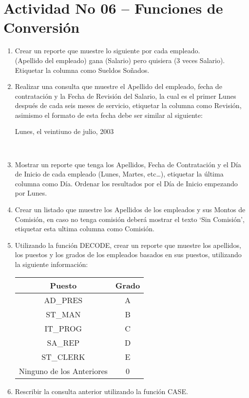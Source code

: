\section{Actividad No 06 – Funciones de Conversi\'on} 
		
\begin{enumerate}[1.]
	\item Crear un reporte que muestre lo siguiente por cada empleado.
	\\(Apellido del empleado) gana (Salario) pero quisiera (3 veces Salario).
	\\Etiquetar la columna como Sueldos Soñados.
	\\
	
	\item Realizar una consulta que muestre el Apellido del empleado, fecha de contratación y la Fecha de Revisión del Salario, la cual es el primer Lunes después de cada seis meses de servicio, etiquetar la columna como Revisión, asimismo el formato de esta fecha debe ser similar al siguiente: 
	\begin{center}
	Lunes, el veintiuno de julio, 2003 
	\end{center}
\	
	\item Mostrar un reporte que tenga los Apellidos, Fecha de Contrataci\'on y el D\'ia de Inicio de cada empleado (Lunes, Martes, etc…), etiquetar la \'ultima columna como D\'ia. Ordenar los resultados por el D\'ia de Inicio empezando por Lunes.
	\\	

	\item Crear un listado que muestre los Apellidos de los empleados y sus Montos de Comisión, en caso no tenga comisi\'on deber\'a mostrar el texto ‘Sin Comisi\'on’, etiquetar esta ultima columna como Comisi\'on.	
	\\
	
	\item Utilizando la función DECODE, crear un reporte que muestre los apellidos, los puestos y los grados de los empleados basados en sus puestos, utilizando la siguiente información:
	\begin{center}
		\begin{tabular}{ c c }
		Puesto & Grado \\
		\hline
		AD\_PRES & A \\
		ST\_MAN & B \\
		IT\_PROG & C \\
		SA\_REP & D \\
		ST\_CLERK & E \\
		Ninguno de los Anteriores & 0 \\
		\end{tabular}
	\end{center}
	\item Rescribir la consulta anterior utilizando la función CASE.
	\\
	
\end{enumerate}
